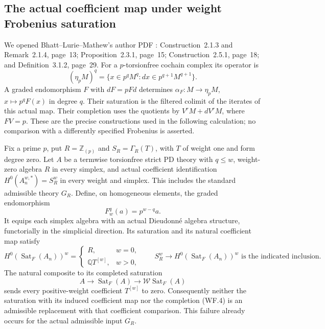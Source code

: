 \subsection{The actual coefficient map under weight Frobenius saturation}

We opened Bhatt--Lurie--Mathew's author PDF
\cite{Root_BhattLurieMathew2020}: Construction~2.1.3 and
Remark~2.1.4, page~13; Proposition~2.3.1, page~15;
Construction~2.5.1, page~18; and Definition~3.1.2, page~29.
For a $p$-torsionfree cochain complex its operator is
\[
 (\eta_pM)^q=\{x\in p^qM^q:dx\in p^{q+1}M^{q+1}\}.
 \tag{WF.1}
\]
A graded endomorphism $F$ with $dF=pFd$ determines
$\alpha_F:M\to\eta_pM$, $x\mapsto p^qF(x)$ in degree $q$.
Their saturation is the filtered colimit of the iterates
of this actual map. Their completion uses the quotients
by $V^rM+dV^rM$, where $FV=p$.
These are the precise constructions used in the following
calculation; no comparison with a differently specified
Frobenius is asserted.

\begin{proposition}
\label{AWF01}
Fix a prime $p$, put $R=\mathbb Z_{(p)}$ and
$S_R=\Gamma_R(T)$, with $T$ of weight one and form degree zero.
Let $A$ be a termwise torsionfree strict PD theory with
$q\leq w$, weight-zero algebra $R$ in every simplex,
and actual coefficient identification
$H^0(A_n^{w,*})=S_R^w$ in every weight and simplex.
This includes the standard admissible theory $G_R$.
Define, on homogeneous elements, the graded endomorphism
\[
                     F_w^q(a)=p^{w-q}a.             \tag{WF.2}
\]
It equips each simplex algebra with an actual Dieudonn\'e
algebra structure, functorially in the simplicial direction.
Its saturation and its natural coefficient map satisfy
\[
 H^0(\operatorname{Sat}_F(A_n))^w=
 \begin{cases}
 R,&w=0,\\
 \mathbb Q T^{[w]},&w>0,
 \end{cases}
 \qquad
 S_R^w\longrightarrow H^0(\operatorname{Sat}_F(A_n))^w
 \text{ is the indicated inclusion}.               \tag{WF.3}
\]
The natural composite to its completed saturation
\[
              A\longrightarrow\operatorname{Sat}_F(A)
                \longrightarrow\mathcal W\operatorname{Sat}_F(A)
 \tag{WF.4}
\]
sends every positive-weight coefficient $T^{[w]}$ to zero.
Consequently neither the saturation with its induced
coefficient map nor the completion (WF.4) is an admissible
replacement with that coefficient comparison.  This failure
already occurs for the actual admissible input $G_R$.
\end{proposition}


